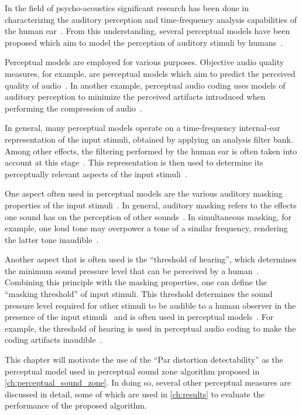 In the field of psycho-acoustics significant research has been done in characterizing the auditory 
perception and time-frequency
analysis capabilities of the human ear~\cite{painter2000perceptual}.
From this understanding, several perceptual models have been proposed which aim to model the 
perception of auditory stimuli by humans~\cite{van2005perceptual}.

Perceptual models are employed for various purposes.
Objective audio quality measures, for example, are perceptual models which aim to predict the perceived quality of audio~\cite{torcoli2021objective}.
In another example, perceptual audio coding uses models of auditory perception to minimize the perceived artifacts introduced when
performing the compression of audio~\cite{herre2019psychoacoustic}.

In general, many perceptual models operate on a time-frequency internal-ear representation of the input stimuli, obtained by applying an analysis filter bank. 
Among other effects, the filtering performed by the human ear is often taken 
into account at this stage~\cite{van2005perceptual, taal2012low}.
This representation is then used to determine its perceptually relevant aspects 
of the input stimuli~\cite{herre2019psychoacoustic}.

One aspect often used in perceptual models are the various auditory masking properties of the 
input stimuli~\cite{herre2019psychoacoustic}.
In general, auditory masking refers to the effects one sound has on the perception of other sounds~\cite{painter2000perceptual}.
In simultaneous masking, for example, one loud tone may overpower a tone of a similar frequency, rendering the 
latter tone inaudible~\cite{painter2000perceptual}.

Another aspect that is often used is the ``threshold of hearing'', which determines the minimum sound pressure level that can be perceived by a human~\cite{herre2019psychoacoustic}.
Combining this principle with the masking properties, one can define the ``masking threshold'' of input stimuli.
This threshold determines the sound pressure level required for other stimuli to be audible to a human observer in the presence of the input stimuli~\cite{painter2000perceptual} and is often used in perceptual 
models~\cite{van2005perceptual, taal2012low}. 
For example, the threshold of hearing is used in perceptual audio coding to 
make the coding artifacts inaudible~\cite{herre2019psychoacoustic}.

This chapter will motivate the use of the ``Par distortion detectability'' as the perceptual model used in 
perceptual sound zone algorithm proposed in \autoref{ch:perceptual_sound_zone}.
In doing so, several other perceptual measures are discussed in detail, some of which are used in \autoref{ch:results} to evaluate the performance of the proposed algorithm.

